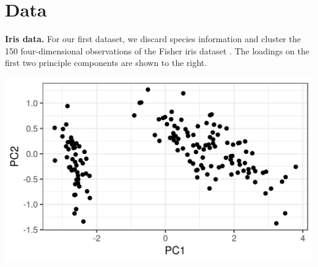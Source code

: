 \documentclass[a0,plainsections,30pt]{sciposter}\usepackage[]{graphicx}\usepackage[]{color}
\newenvironment{knitrout}{}{} %
\begin{document}
\hfill \vrule \hfill
\begin{minipage}[t]{0.45\textwidth}




\section*{Data}
\vspace{-0.3in}
%
\begin{minipage}[t]{0.49\textwidth}
%
\textbf{Iris data.}
For our first dataset, we discard species
information and cluster the 150 four-dimensional observations of the Fisher iris
dataset \citep{iris_data_anderson}.
The loadings on the first two principle components are shown
to the right.
%
\end{minipage}
%
\begin{minipage}[t]{0.49\textwidth}

%
\vspace{-0.4in}
\begin{knitrout}
\color{fgcolor}

{\centering \includegraphics[width=0.98\linewidth,height=0.588\linewidth]{figure/iris_pca-1} 

}



\end{knitrout}
\end{minipage}
%

\vspace{1em}


\end{minipage}
\end{document}
